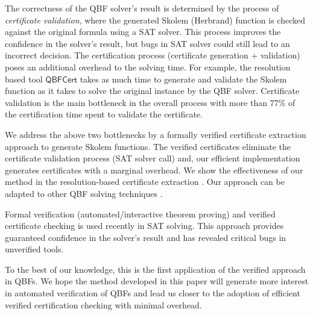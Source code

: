 \documentclass[runningheads]{llncs}
\newcommand{\qrpcert}{\mathsf{QBFCert}}
\newcommand{\0}{0}
\newcommand{\1}{1}
\begin{document}
The correctness of the QBF solver's result is determined by the process of \textit{certificate validation}, where the generated Skolem (Herbrand) function is checked against the original formula using a SAT solver. This process improves the confidence in the solver's result, but bugs in SAT solver could still lead to an incorrect decision. The certification process (certificate generation + validation) poses an additional overhead to the solving time. For example, the resolution based tool $\qrpcert$ takes as much time to generate and validate the Skolem function as it takes to solve the original instance by the QBF solver. Certificate validation is the main bottleneck in the overall process \cite{NiemetzPLSB12} with more than 77\% of the certification time spent to validate the certificate.



We address the above two bottlenecks by a formally verified certificate extraction approach to generate Skolem functions. The verified certificates eliminate the certificate validation process (SAT solver call) and, our efficient implementation generates certificates with a marginal overhead. We show the effectiveness of our method in the resolution-based certificate extraction \cite{NiemetzPLSB12}. Our approach can be adapted to other QBF solving techniques \cite{RabeT15}.  

Formal verification (automated/interactive theorem proving) \cite{Fleury2018a, Fleury2019a, BlanchetteFLW18} and verified certificate checking \cite{Cruz2017, Cruz2017b, Heule2017a, Lammich17} is used recently in SAT solving. This approach provides guaranteed confidence in the solver's result and has revealed critical bugs \cite{Lammich17} in unverified tools. 

To the best of our knowledge, this is the first application of the verified approach in QBFs. We hope the method developed in this paper will generate more interest in automated verification of QBFs and lead us closer to the adoption of efficient verified certification checking with minimal overhead.
\end{document}
